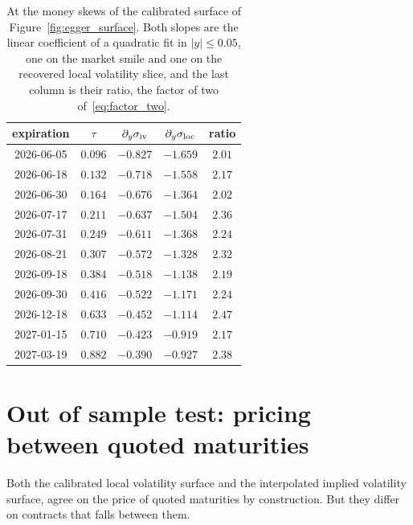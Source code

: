 \begin{table}[h!]
    \centering
    \begin{tabular}{c c c c c}
        \toprule
        expiration & $\tau$ & $\partial_y\sigma_{\mathrm{iv}}$
                   & $\partial_y\sigma_{\mathrm{loc}}$ & ratio \\
        \midrule
        2026-06-05 & $0.096$ & $-0.827$ & $-1.659$ & $2.01$ \\
        2026-06-18 & $0.132$ & $-0.718$ & $-1.558$ & $2.17$ \\
        2026-06-30 & $0.164$ & $-0.676$ & $-1.364$ & $2.02$ \\
        2026-07-17 & $0.211$ & $-0.637$ & $-1.504$ & $2.36$ \\
        2026-07-31 & $0.249$ & $-0.611$ & $-1.368$ & $2.24$ \\
        2026-08-21 & $0.307$ & $-0.572$ & $-1.328$ & $2.32$ \\
        2026-09-18 & $0.384$ & $-0.518$ & $-1.138$ & $2.19$ \\
        2026-09-30 & $0.416$ & $-0.522$ & $-1.171$ & $2.24$ \\
        2026-12-18 & $0.633$ & $-0.452$ & $-1.114$ & $2.47$ \\
        2027-01-15 & $0.710$ & $-0.423$ & $-0.919$ & $2.17$ \\
        2027-03-19 & $0.882$ & $-0.390$ & $-0.927$ & $2.38$ \\
        \bottomrule
    \end{tabular}
    \caption{
        At the money skews of the calibrated surface of Figure~\ref{fig:egger_surface}.
        Both slopes are the linear coefficient of a quadratic fit in $|y| \le 0.05$, one on the
        market smile and one on the recovered local volatility slice, and the last column is
        their ratio, the factor of two of~\eqref{eq:factor_two}.
    }
    \label{tab:egger_skew}
\end{table}

\section{Out of sample test: pricing between quoted maturities}\label{sec:holdout}

Both the calibrated local volatility surface and the interpolated implied volatility surface,
agree on the price of quoted maturities by construction.
But they differ on contracts that falls between them.

